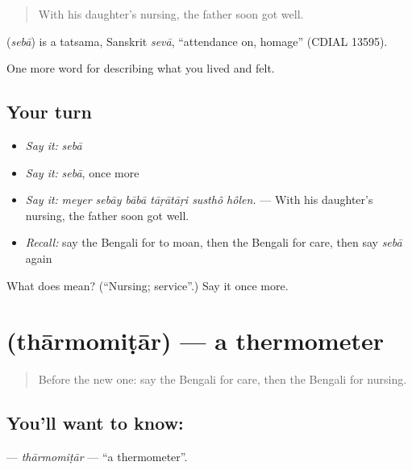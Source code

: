 \begin{quote}
With his daughter's nursing, the father soon got well.
\end{quote}

\begin{cousinweb}
\textbf{} (\emph{sebā}) is a tatsama, Sanskrit \emph{sevā}, \textquotedblleft{}attendance on, homage\textquotedblright{} (CDIAL 13595).
\end{cousinweb}

\begin{grammarlens}[title={What you've built}]
One more word for describing what you lived and felt.
\end{grammarlens}

\subsection*{Your turn}
\begin{itemize}
\raggedright
  \item \emph{Say it:} \emph{sebā}
  \item \emph{Say it:} \emph{sebā}, once more
  \item \emph{Say it:} \emph{meyer sebāy bābā tāṛātāṛi susthô hôlen.} — With his daughter's nursing, the father soon got well.
  \item \emph{Recall:} say the Bengali for to moan, then the Bengali for care, then say \emph{sebā} again
\end{itemize}

\begin{tcolorbox}[breakable,colback=teal!4,colframe=teal!35!black,title={Before you move on}]
What does  mean? (\textquotedblleft{}Nursing; service\textquotedblright{}.) Say it once more.
\end{tcolorbox}
\section[\texorpdfstring{\bn{থার্মোমিটার} (thārmomiṭār)}{থার্মোমিটার (thārmomiṭār)}]{ (thārmomiṭār) — a thermometer}

\label{lesson:BN-C478-tharmomitar}



\begin{quote}
Before the new one: say the Bengali for care, then the Bengali for nursing.
\end{quote}

\subsection*{You'll want to know: }
\textbf{} — \emph{thārmomiṭār} — \textquotedblleft{}a thermometer\textquotedblright{}.

